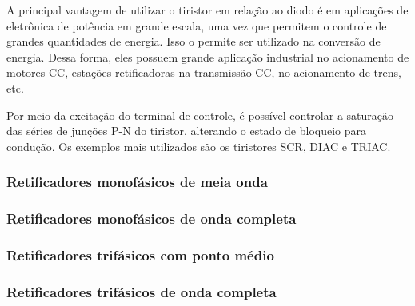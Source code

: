 A principal vantagem de utilizar o tiristor em relação ao diodo é em aplicações de eletrônica de potência em grande escala, uma vez que permitem o controle de grandes quantidades de energia. Isso o permite ser utilizado na conversão de energia. Dessa forma, eles possuem grande aplicação industrial no acionamento de motores CC, estações retificadoras na transmissão CC, no acionamento de trens, etc. 

Por meio da excitação do terminal de controle, é possível controlar a saturação das séries de junções P-N do tiristor, alterando o estado de bloqueio para condução. Os exemplos mais utilizados são os tiristores SCR, DIAC e TRIAC.

\subsubsection{Retificadores monofásicos de meia onda}



\subsubsection{Retificadores monofásicos de onda completa}


 
\subsubsection{Retificadores trifásicos com ponto médio}


 
\subsubsection{Retificadores trifásicos de onda completa}



